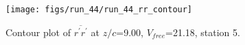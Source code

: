 \begin{figure}[H]
\centering
\texttt{[image: figs/run\_44/run\_44\_rr\_contour]}
\caption{Contour plot of $\overline{r^\prime r^\prime}$ at $z/c$=9.00, $V_{free}$=21.18, station 5.}
\label{fig:run_44_rr_contour}
\end{figure}


